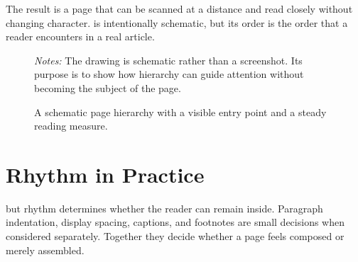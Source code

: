 \documentclass[11pt]{article}
\begin{document}
The result is a page that can be scanned at a distance and read closely without
changing character.
 is intentionally schematic, but its order is the order
that a reader encounters in a real article.

\begin{figure}[tbp]
  \centering
  \setlength{\fboxsep}{10pt}
  \caption{A schematic page hierarchy with a visible entry point and a steady
    reading measure.}
  \label{fig:page-rhythm}
  \begin{lanepaperfigurenotes}
    \emph{Notes:} The drawing is schematic rather than a screenshot.
    Its purpose is to show how hierarchy can guide attention without becoming
    the subject of the page.
  \end{lanepaperfigurenotes}
\end{figure}

\section{Rhythm in Practice}
\label{sec:rhythm}

 but rhythm determines whether the
reader can remain inside.
Paragraph indentation, display spacing, captions, and footnotes are small
decisions when considered separately.
Together they decide whether a page feels composed or merely assembled.
\end{document}
